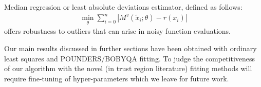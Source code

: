 Median regression or least absolute deviations estimator, defined as follows:
\begin{align}
    \min\limits_{\theta}\sum\limits_{i=0}^{n}|M^v(\tilde{x}_i;\theta)-r(x_i)|
    \label{eq:fit-lad}
\end{align}
offers robustness to outliers that can arise in noisy function evaluations.

Our main results discussed in further sections have been obtained with ordinary least squares and POUNDERS/BOBYQA fitting. To judge the competitiveness of our algorithm with the novel (in trust region literature) fitting methods will require fine-tuning of hyper-parameters which we leave for future work.
